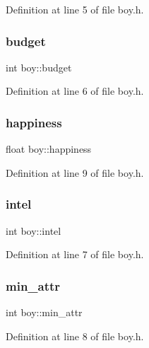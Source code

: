 Definition at line 5 of file boy.\+h.

\mbox{\label{classboy_a80d6bd6642a612cf0428ab56a2098316}} 
\subsubsection{\texorpdfstring{budget}{budget}}
{\footnotesize\ttfamily int boy\+::budget}



Definition at line 6 of file boy.\+h.

\mbox{\label{classboy_a69f63baff79a956ab252f98dfda681b9}} 
\subsubsection{\texorpdfstring{happiness}{happiness}}
{\footnotesize\ttfamily float boy\+::happiness}



Definition at line 9 of file boy.\+h.

\mbox{\label{classboy_a71d1abd867065c974a0a5fc82816251e}} 
\subsubsection{\texorpdfstring{intel}{intel}}
{\footnotesize\ttfamily int boy\+::intel}



Definition at line 7 of file boy.\+h.

\mbox{\label{classboy_a49a62cdd558aba0ae0ed7d4b4a67e7e6}} 
\subsubsection{\texorpdfstring{min\+\_\+attr}{min\_attr}}
{\footnotesize\ttfamily int boy\+::min\+\_\+attr}



Definition at line 8 of file boy.\+h.

\mbox{\label{classboy_a703fa58417037fd55aaa45942fb550a5}} 
